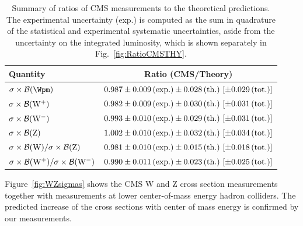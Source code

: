 \begin{table} %
\begin{center}
\caption[.]{ Summary of ratios of CMS measurements to the theoretical predictions. 
The experimental uncertainty (exp.) is computed as the sum in quadrature of
the statistical and experimental systematic uncertainties, aside from the uncertainty on the 
integrated luminosity, which is shown separately in Fig.~\ref{fig:RatioCMSTHY}.}
\begin{tabular}{|l|c|}
\hline
Quantity & Ratio (CMS/Theory) \\
\hline\hline
$\SIGBRSHORT{\Wpm}$   & $\RATCMSTHYWI$ \\
$\SIGBRSHORT{\Wp}$     & $\RATCMSTHYWP$ \\
$\SIGBRSHORT{\Wm}$     & $\RATCMSTHYWM$ \\
$\SIGBRSHORT{\Zo}$       & $\RATCMSTHYZ$  \\
$\SIGBRSHORT{\Wo}/\SIGBRSHORT{\Zo}$     & $\RATCMSTHYWZ$ \\
$\SIGBRSHORT{\Wp}/\SIGBRSHORT{\Wm}$ & $\RATCMSTHYWW$ \\
\hline
\end{tabular}
\label{tab:RatioCMSTHY}
\end{center}
\end{table}


Figure~\ref{fig:WZsigmas} shows the CMS W and Z cross section measurements together
with measurements at lower center-of-mass energy hadron colliders.
The predicted increase of the cross sections with center of mass energy is confirmed
by our measurements.

